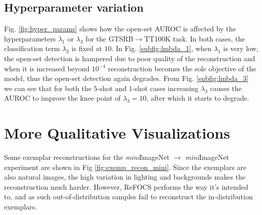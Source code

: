 \documentclass[10pt,journal,compsoc]{IEEEtran}
\begin{document}
  \subsection{Hyperparameter variation}
  Fig. \ref{fig:hyper_params} shows how the open-set AUROC is affected by the hyperparameters $\lambda_1$ or $\lambda_3$ for the GTSRB$\rightarrow$TT100K task. In both cases, the classification term $\lambda_2$ is fixed at $10$. In Fig. \ref{subfig:lmbda_1}, when $\lambda_1$ is very low, the open-set detection is hampered due to poor quality of the reconstruction and when it is increased beyond $10^{-4}$ reconstruction becomes the sole objective of the model, thus the open-set detection again degrades. From Fig. \ref{subfig:lmbda_3} we can see that for both the $5$-shot and $1$-shot cases increasing $\lambda_3$ causes the AUROC to improve the knee point of $\lambda_3=10$, after which it starts to degrade.

% 
% 
\section{More Qualitative Visualizations}

Some exemplar reconstructions for the \textit{mini}ImageNet $\rightarrow$ \textit{mini}ImageNet experiment are shown in Fig \ref{fig:exemp_recon_mini}. Since the exemplars are also natural images, the high variation in lighting and backgrounds makes the reconstruction much harder. However, ReFOCS performs the way it's intended to, and as such out-of-distribution samples fail to reconstruct the in-distribution exemplars.






\end{document}
